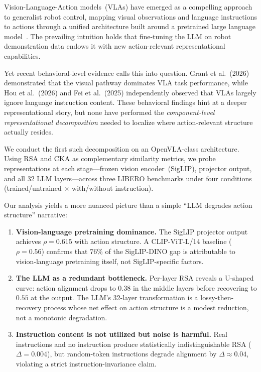 \documentclass[letterpaper]{article}
\begin{document}
Vision-Language-Action models~(VLAs) have emerged as a compelling approach to generalist robot control, mapping visual observations and language instructions to actions through a unified architecture built around a pretrained large language model~\citep{brohan2023rt2, kim2024openvla}.
The prevailing intuition holds that fine-tuning the LLM on robot demonstration data endows it with new action-relevant representational capabilities.

Yet recent behavioral-level evidence calls this into question.
Grant et al.~(2026) demonstrated that the visual pathway dominates VLA task performance, while Hou et al.~(2026) and Fei et al.~(2025) independently observed that VLAs largely ignore language instruction content.
These behavioral findings hint at a deeper representational story, but none have performed the \emph{component-level representational decomposition} needed to localize where action-relevant structure actually resides.

We conduct the first such decomposition on an OpenVLA-class architecture.
Using RSA and CKA as complementary similarity metrics, we probe representations at each stage---frozen vision encoder~(SigLIP), projector output, and all 32 LLM layers---across three LIBERO benchmarks under four conditions (trained/untrained $\times$ with/without instruction).

Our analysis yields a more nuanced picture than a simple ``LLM degrades action structure'' narrative:

\begin{enumerate}
  \item \textbf{Vision-language pretraining dominance.} The SigLIP projector output achieves $\rho=0.615$ with action structure. A CLIP-ViT-L/14 baseline ($\rho=0.56$) confirms that 76\% of the SigLIP-DINO gap is attributable to vision-language pretraining itself, not SigLIP-specific factors.
  \item \textbf{The LLM as a redundant bottleneck.} Per-layer RSA reveals a U-shaped curve: action alignment drops to $0.38$ in the middle layers before recovering to $0.55$ at the output. The LLM's 32-layer transformation is a lossy-then-recovery process whose net effect on action structure is a modest reduction, not a monotonic degradation.
  \item \textbf{Instruction content is not utilized but noise is harmful.} Real instructions and no instruction produce statistically indistinguishable RSA ($\Delta=0.004$), but random-token instructions degrade alignment by $\Delta\approx0.04$, violating a strict instruction-invariance claim.
\end{enumerate}
\end{document}
